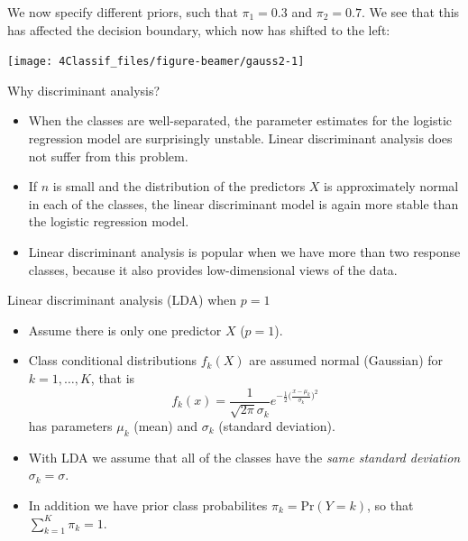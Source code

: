 \documentclass[10pt,ignorenonframetext,]{beamer}
\begin{document}
\begin{frame}

We now specify different priors, such that \(\pi_1 = 0.3\) and
\(\pi_2 = 0.7\). We see that this has affected the decision boundary,
which now has shifted to the left:

\begin{center}\texttt{[image: 4Classif\_files/figure-beamer/gauss2-1]} \end{center}

\end{frame}

\begin{frame}

\begin{block}{Why discriminant analysis?}

\begin{itemize}
\item
  When the classes are well-separated, the parameter estimates for the
  logistic regression model are surprisingly unstable. Linear
  discriminant analysis does not suffer from this problem.
\item
  If \(n\) is small and the distribution of the predictors \(X\) is
  approximately normal in each of the classes, the linear discriminant
  model is again more stable than the logistic regression model.
\item
  Linear discriminant analysis is popular when we have more than two
  response classes, because it also provides low-dimensional views of
  the data.
\end{itemize}

\end{block}

\end{frame}

\begin{frame}{Linear discriminant analysis (LDA) when \(p=1\)}

\begin{itemize}
\item
  Assume there is only one predictor \(X\) (\(p=1\)).
\item
  Class conditional distributions \(f_k(X)\) are assumed normal
  (Gaussian) for \(k=1,\ldots,K\), that is
  \[f_k(x) = \frac{1}{\sqrt{2\pi}\sigma_k} e^{-\frac{1}{2}\big(\frac{x-\mu_k}{\sigma_k}\big)^2} \]
  has parameters \(\mu_k\) (mean) and \(\sigma_k\) (standard deviation).
\item
  With LDA we assume that all of the classes have the \emph{same
  standard deviation} \(\sigma_k = \sigma\).
\item
  In addition we have prior class probabilites \(\pi_k=\text{Pr}(Y=k)\),
  so that \(\sum_{k=1}^K \pi_k=1\).
\end{itemize}

\end{frame}
\end{document}
